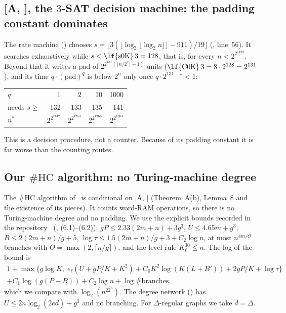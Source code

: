 \documentclass[10pt]{amsart}
\theoremstyle{definition}
\theoremstyle{remark}
\numberwithin{equation}{section}
\newcommand{\A}[1][]{\textup{[A\if\relax\detokenize{#1}\relax\else, #1\fi]}}
\newcommand{\HC}{\#\mathrm{HC}}
\newcommand{\nst}{n^{*}}
\begin{document}
\subsection{\texorpdfstring{\A}{[A]}, the \texorpdfstring{$3$}{3}-SAT decision machine: the padding constant dominates}\label{sec:decision}
The rate machine  () chooses
$s=\lfloor3(\lfloor\log_2\lfloor\log_2n\rfloor\rfloor-911)/19\rfloor$ (,
 line~56). It searches exhaustively while $s<\text{\lf{s0K}}\,3=128$, that is, for
every $n<2^{2^{1722}}$. Beyond that it writes a pad of $2^{2^{131}(\lfloor n/2^s\rfloor+1)}$ units
($\text{\lf{C0K}}\,3=8\cdot2^{128}=2^{131}$), and its time $q\cdot(\text{pad})^q$ is below $2^n$
only once $q\cdot2^{131-s}<1$:
\begin{center}\small
\begin{tabular}{@{}lrrrr@{}}
\toprule
$q$ & 1 & 2 & 10 & 1000\\
needs $s\ge$ & 132 & 133 & 135 & 141\\
$\nst$ & $2^{2^{1747}}$ & $2^{2^{1754}}$ & $2^{2^{1766}}$ & $2^{2^{1804}}$\\
\bottomrule
\end{tabular}
\end{center}
This is a decision procedure, not a counter. Because of its padding constant it is far worse than
the counting routes.

\subsection{Our \texorpdfstring{$\HC$}{\#HC} algorithm: no Turing-machine degree}\label{sec:hc}
The $\HC$ algorithm of~\cite{Tulsyan26} is conditional on \A{} (Theorem~A(b), Lemma~8 and the
existence of its pieces). It counts word-RAM operations, so there is no Turing-machine degree and
no padding. We use the explicit bounds recorded in the repository~\cite{TulsyanRepo26}
(, (6.1)--(6.2)): $gP\le2.33(2m+n)+3g^3$, $U\le4.65m+g^3$,
$B\le2(2m+n)/g+5$, $\log\tau\le1.5(2m+n)/g+3+C_2\log n$, at most $n^{4m/\Theta}$ branches with
$\Theta=\max(2,\lceil n/g\rceil)$, and the level rule $K_\ell^{30}\le n$. The log of the bound is
\begin{multline*}
1+\max\bigl\{g\log K,\;e_\ell(U+gP/K+K^2)+C_0K^2\log(K(L+B'))+2gP/K+\log\tau\bigr\}\\
+C_1\log(g(P+B))+C_2\log n+\log\#\text{branches},
\end{multline*}
which we compare with $\log_2(n^22^n)$. The degree network () has
$U\le2n\log_2(2e\bar d)+g^3$ and no branching. For $\Delta$-regular graphs we take $\bar d=\Delta$.
\end{document}
